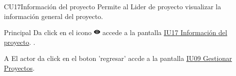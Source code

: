 \begin{UseCase}{CU17}{Información del proyecto}{
		Permite al Lider de proyecto visualizar la información general del proyecto.
	}
	\end{UseCase}
	\begin{UCtrayectoria}{Principal}
		\UCpaso[\UCactor] Da click en el icono \includegraphics[height=10pt]{./images/iconos/ic_visibility_black_18dp.png}
        \UCpaso [\UCsist] accede a la pantalla \hyperref[fig:IU17]{IU17 Información del proyecto}. \label{item:CU17Item1} .
	\end{UCtrayectoria}

		\begin{UCtrayectoriaA}{A}{ El actor da click en el boton 'regresar'}
			\UCpaso [\UCsist] accde a la pantalla \hyperref[fig:IU09]{IU09 Gestionar Proyectos}.
		\end{UCtrayectoriaA}		
		
		
